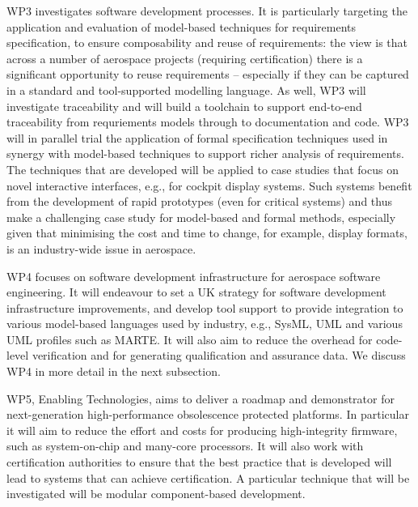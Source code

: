 WP3 investigates software development processes. It is particularly targeting the application and evaluation of model-based techniques for requirements
specification, to ensure composability and reuse of requirements: the view is that across a number of aerospace projects (requiring certification) there is a significant opportunity to reuse requirements -- especially if they can be captured in a standard and tool-supported modelling language. As well, WP3 will investigate traceability and will build a toolchain to support end-to-end
traceability from requriements models through to documentation and code. WP3 will in parallel trial the application of formal specification techniques used in
synergy with model-based techniques to support richer analysis of requirements. The techniques that are developed will be applied to case studies that
focus on novel interactive interfaces, e.g., for cockpit display systems. Such systems benefit from the development of rapid prototypes (even for critical
systems) and thus make a challenging case study for model-based and formal methods, especially given that minimising the cost and time to change,
for example, display formats, is an industry-wide issue in aerospace.

WP4 focuses on software development infrastructure for aerospace software engineering. It will endeavour to set a UK strategy for software development
infrastructure improvements, and  develop tool support to provide integration to various model-based languages used by industry, e.g., SysML, UML and
various UML profiles such as MARTE. It will also aim to reduce the overhead for code-level verification and for generating qualification and assurance data.
We discuss WP4 in more detail in the next subsection.

WP5, Enabling Technologies, aims to deliver a roadmap and demonstrator for next-generation high-performance obsolescence protected platforms. In particular
it will aim to reduce the effort and costs for producing high-integrity firmware, such as system-on-chip and many-core processors. It will also work with certification
authorities to ensure that the best practice that is developed will lead to systems that can achieve certification. A particular technique that will be investigated will
be modular component-based development.

